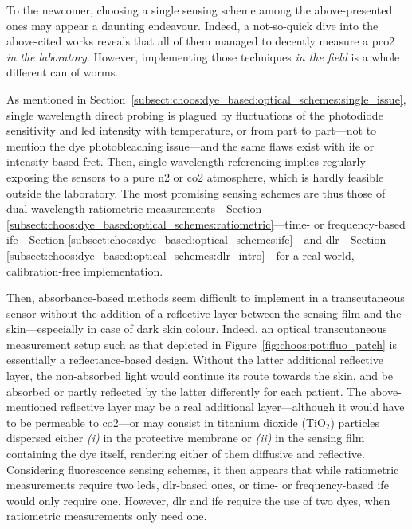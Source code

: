 To the newcomer, choosing a single sensing scheme among the above-presented ones may appear a daunting endeavour. Indeed, a not-so-quick dive into the above-cited works reveals that all of them managed to decently measure a \gls{pco2} \emph{in the laboratory}. However, implementing those techniques \emph{in the field} is a whole different can of worms.

As mentioned in Section~\ref{subsect:choos:dye_based:optical_schemes:single_issue}, single wavelength direct probing is plagued by fluctuations of the photodiode sensitivity and \gls{led} intensity with temperature, or from part to part---not to mention the dye photobleaching issue---and the same flaws exist with \gls{ife} or intensity-based \gls{fret}. Then, single wavelength referencing implies regularly exposing the sensors to a pure \gls{n2} or \gls{co2} atmosphere, which is hardly feasible outside the laboratory. The most promising sensing schemes are thus those of dual wavelength ratiometric measurements---Section \ref{subsect:choos:dye_based:optical_schemes:ratiometric}---time- or frequency-based \gls{ife}---Section \ref{subsect:choos:dye_based:optical_schemes:ife}---and \gls{dlr}---Section \ref{subsect:choos:dye_based:optical_schemes:dlr_intro}---for a real-world, calibration-free implementation.

Then, absorbance-based methods seem difficult to implement in a transcutaneous sensor without the addition of a reflective layer between the sensing film and the skin---especially in case of dark skin colour. Indeed, an optical transcutaneous measurement setup such as that depicted in Figure~\ref{fig:choos:pot:fluo_patch} is essentially a reflectance-based design. Without the latter additional reflective layer, the non-absorbed light would continue its route towards the skin, and be absorbed or partly reflected by the latter differently for each patient. The above-mentioned reflective layer may be a real additional layer---although it would have to be permeable to \gls{co2}---or may consist in titanium dioxide (TiO$_2$) particles dispersed either \textit{(i)} in the protective membrane or \textit{(ii)} in the sensing film containing the dye itself, rendering either of them diffusive and reflective\cite{borisov2007, dansby2010, pfeifer2020}. Considering fluorescence sensing schemes, it then appears that while ratiometric measurements require two \glspl{led}, \gls{dlr}-based ones, or time- or frequency-based \gls{ife} would only require one. However, \gls{dlr} and \gls{ife} require the use of two dyes, when ratiometric measurements only need one.

